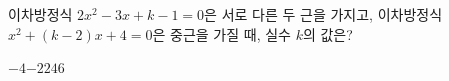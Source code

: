 이차방정식 $2x^2-3x+k-1=0$은 서로 다른 두 근을 가지고, 이차방정식 $x^2+(k-2)x+4=0$은 중근을 가질 때, 실수 $k$의 값은?
\begin{choices32}{$-4$}{$-2$}{$2$}{$4$}{$6$}\end{choices32}
